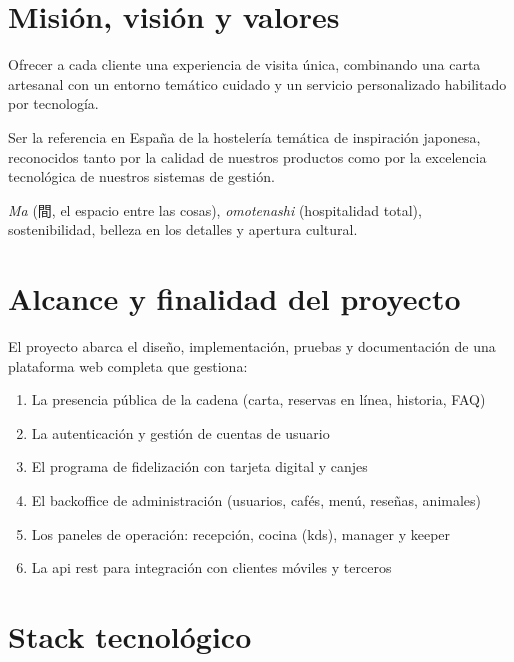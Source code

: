 \documentclass[12pt,a4paper,twoside,openright]{report}
\begin{document}
\section{Misión, visión y valores}
\label{sec:valores}

\begin{description}[style=nextline]
  \item[Misión]
    Ofrecer a cada cliente una experiencia de visita única, combinando una carta
    artesanal con un entorno temático cuidado y un servicio personalizado habilitado
    por tecnología.
  \item[Visión]
    Ser la referencia en España de la hostelería temática de inspiración japonesa,
    reconocidos tanto por la calidad de nuestros productos como por la excelencia
    tecnológica de nuestros sistemas de gestión.
  \item[Valores]
    \textit{Ma} (間, el espacio entre las cosas), \textit{omotenashi} (hospitalidad
    total), sostenibilidad, belleza en los detalles y apertura cultural.
\end{description}

\section{Alcance y finalidad del proyecto}
\label{sec:alcance}

El proyecto abarca el diseño, implementación, pruebas y documentación de una plataforma
web completa que gestiona:

\begin{enumerate}[nosep]
  \item La presencia pública de la cadena (carta, reservas en línea, historia, FAQ)
  \item La autenticación y gestión de cuentas de usuario
  \item El programa de fidelización con tarjeta digital y canjes
  \item El backoffice de administración (usuarios, cafés, menú, reseñas, animales)
  \item Los paneles de operación: recepción, cocina (\gls{kds}), manager y keeper
  \item La \gls{api} \gls{rest} para integración con clientes móviles y terceros
\end{enumerate}

\section{Stack tecnológico}
\label{sec:stack}
\end{document}
